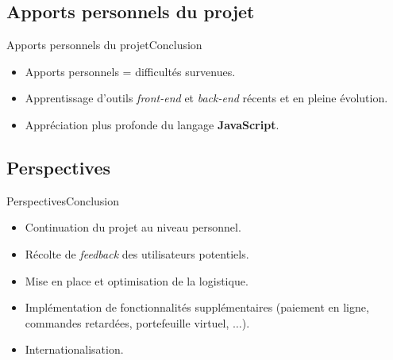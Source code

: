 \documentclass[usenames,dvipsnames]{beamer}
\begin{document}
\subsection{Apports personnels du projet}
\begin{frame}{Apports personnels du projet}{Conclusion}
  \begin{itemize}
    \item Apports personnels = difficultés survenues.
    \item Apprentissage d'outils \textit{front-end} et \textit{back-end} récents et en pleine évolution.
    \item Appréciation plus profonde du langage \textbf{JavaScript}.
  \end{itemize}
\end{frame}
\subsection{Perspectives}
\begin{frame}{Perspectives}{Conclusion}
  \begin{itemize}
    \item Continuation du projet au niveau personnel.
    \item Récolte de \textit{feedback} des utilisateurs potentiels.
    \item Mise en place et optimisation de la logistique.
    \item Implémentation de fonctionnalités supplémentaires (paiement en ligne, commandes retardées, portefeuille virtuel, $\dots$).
    \item Internationalisation.
 \end{itemize}
\end{frame}
\end{document}
